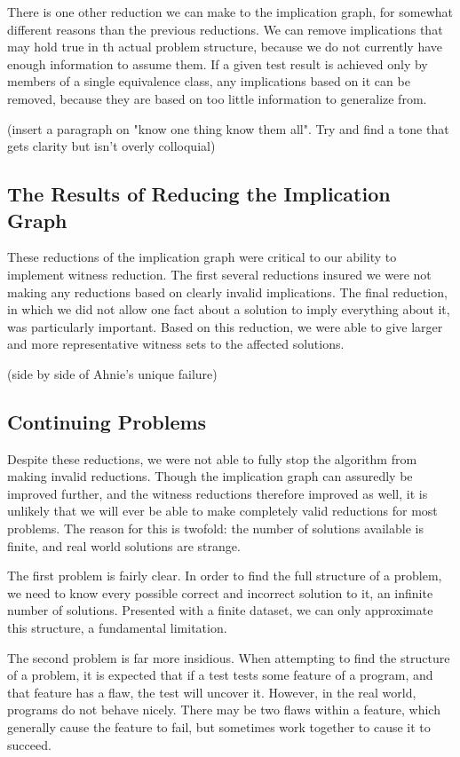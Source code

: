 \documentclass[11pt]{article}
\begin{document}
There is one other reduction we can make to the implication graph, for somewhat different reasons than the previous reductions. We can remove implications that may hold true in th actual problem structure, because we do not currently have enough information to assume them. If a given test result is achieved only by members of a single equivalence class, any implications based on it can be removed, because they are based on too little information to generalize from.

(insert a paragraph on "know one thing know them all". Try and  find a tone that gets clarity but isn't overly colloquial)

\subsection*{The Results  of Reducing the Implication Graph}

These reductions of the implication graph were critical to our ability to implement witness reduction. The first several reductions insured we were not making any reductions based on clearly invalid implications. The final reduction, in which we did not allow one fact about a solution to imply everything about it, was particularly important. Based on this reduction, we were able to give larger and more representative witness sets to the affected solutions.

(side by side of Ahnie's unique failure)

\subsection*{Continuing Problems}

Despite these reductions, we were not able to fully stop the algorithm from making invalid reductions. Though the implication graph can assuredly be improved further, and the witness reductions therefore improved as well, it is unlikely that we will ever be able to make completely valid reductions for most problems. The reason for this is twofold: the number of solutions available is finite, and  real world solutions are strange.

The first problem is fairly clear. In order to find the full structure of a problem, we need to know every possible correct and incorrect solution to it, an infinite  number of solutions. Presented with a finite dataset, we can only approximate this structure, a fundamental limitation.

The second problem is far more insidious. When attempting to find the structure of a problem, it is expected that if a test tests some feature of a program, and that feature has a flaw, the test will uncover it. However, in the real world, programs do not behave nicely. There may be two flaws within a feature, which generally cause the feature to fail, but sometimes work together to cause it to succeed.
\end{document}
